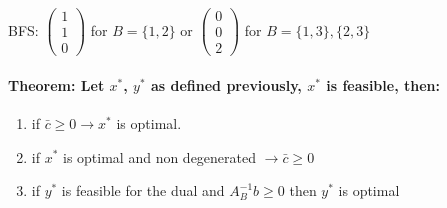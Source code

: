 \documentclass[main]{subfiles}
\begin{document}
BFS:
$\begin{pmatrix}
1\\
1\\
0
\end{pmatrix}$ for $B = \{1, 2\}$ or
$\begin{pmatrix}
0\\
0\\
2
\end{pmatrix}$ for $B = \{1,3\}, \{2, 3\}$

\paragraph{Theorem: Let $x^*$, $y^*$ as defined previously, $x^*$ is feasible,
then:}
\begin{enumerate}
\item if $\bar{c} \geq 0 \rightarrow x^*$ is optimal.
\item if $x^*$ is optimal and non degenerated $\rightarrow \bar{c} \geq 0$
\item if $y^*$ is feasible for the dual and $A^{-1}_B b \geq 0$ then $y^*$ is
optimal

\end{enumerate}
\end{document}
